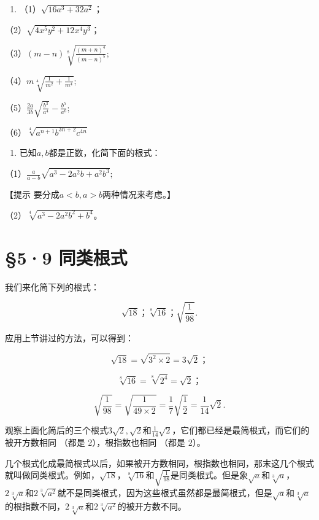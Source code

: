 \begin{enumerate}[start=3]
\item
  （1）\(\sqrt{16a^3 + 32a^2}\)；
\end{enumerate}

（2）\(\sqrt{4x^5y^2 + 12x^4y^3}\)；

（3）\((m - n)\sqrt[8]{\frac{(m + n)^4}{(m - n)^5}};\)

（4）\(m\sqrt[4]{\frac{1}{m^2} + \frac{1}{m^4}};\)

（5）\(\frac{2a}{3b}\sqrt{\frac{b^3}{a^4}} -\frac{b^5}{a^6};\)

（6）\(\sqrt[4]{a^{n+1}b^{3n+2}c^{4n}}\)

\begin{enumerate}[start=4]
\item
  已知\(a, b\)都是正数，化简下面的根式：
\end{enumerate}

（1）\(\frac{a}{a - b}\sqrt{a^3 - 2a^2b + a^2b^3};\)

【提示 要分成\(a < b, a > b\)两种情况来考虑。】

（2）\(\sqrt[4]{a^3 - 2a^2b^2 + b^4}\)。

\section{§5·9 同类根式}

我们来化简下列的根式：

\[
\sqrt {18}\text{；} \sqrt[8]{16}\text{；} \sqrt {\frac{1}{98}}.
\]

应用上节讲过的方法，可以得到：

\[
\sqrt {18} = \sqrt {3 ^ {2} \times 2} = 3 \sqrt {2}\text{；}
\]

\[
\sqrt[8]{16} = \sqrt[8]{2 ^ {4}} = \sqrt {2}\text{；}
\]

\[
\sqrt {\frac{1}{98}} = \sqrt {\frac{1}{49 \times 2}} = \frac{1}{7} \sqrt {\frac{1}{2}} = \frac{1}{14} \sqrt {2}.
\]

观察上面化简后的三个根式\(3\sqrt{2}, \sqrt{2}\)和\(\frac{1}{14}\sqrt{2}\)，它们都已经是最简根式，而它们的被开方数相同
（都是 2），根指数也相同 （都是 2）。

几个根式化成最简根式以后，如果被开方数相同，根指数也相同，那末这几个根式就叫做同类根式。例如，\(\sqrt{18}\)，\(\sqrt[8]{16}\)和\(\sqrt{\frac{1}{98}}\)是同类根式。但是象\(\sqrt{a}\)和\(\sqrt[3]{a}\)，\(2\sqrt[3]{a}\)和\(2\sqrt[3]{a^2}\)就不是同类根式，因为这些根式虽然都是最简根式，但是\(\sqrt{a}\)和\(\sqrt[3]{a}\)的根指数不同，\(2\sqrt[3]{a}\)和\(2\sqrt[3]{a^2}\)的被开方数不同。

